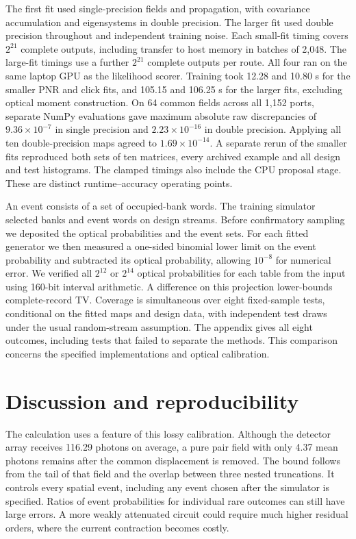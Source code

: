 \documentclass[11pt]{article}
\begin{document}
The first fit used single-precision fields and propagation, with covariance accumulation and eigensystems in double precision. The larger fit used double precision throughout and independent training noise. Each small-fit timing covers $2^{21}$ complete outputs, including transfer to host memory in batches of 2,048. The large-fit timings use a further $2^{21}$ complete outputs per route. All four ran on the same laptop GPU as the likelihood scorer. Training took 12.28 and 10.80 s for the smaller PNR and click fits, and 105.15 and 106.25 s for the larger fits, excluding optical moment construction. On 64 common fields across all 1,152 ports, separate NumPy evaluations gave maximum absolute raw discrepancies of $9.36\times10^{-7}$ in single precision and $2.23\times10^{-16}$ in double precision. Applying all ten double-precision maps agreed to $1.69\times10^{-14}$. A separate rerun of the smaller fits reproduced both sets of ten matrices, every archived example and all design and test histograms. The clamped timings also include the CPU proposal stage. These are distinct runtime--accuracy operating points.

An event consists of a set of occupied-bank words. The training simulator selected banks and event words on design streams. Before confirmatory sampling we deposited the optical probabilities and the event sets. For each fitted generator we then measured a one-sided binomial lower limit on the event probability and subtracted its optical probability, allowing $10^{-8}$ for numerical error. We verified all $2^{12}$ or $2^{14}$ optical probabilities for each table from the input using 160-bit interval arithmetic. A difference on this projection lower-bounds complete-record TV. Coverage is simultaneous over eight fixed-sample tests, conditional on the fitted maps and design data, with independent test draws under the usual random-stream assumption. The appendix gives all eight outcomes, including tests that failed to separate the methods. This comparison concerns the specified implementations and optical calibration.

\section{Discussion and reproducibility}
The calculation uses a feature of this lossy calibration. Although the detector array receives 116.29 photons on average, a pure pair field with only 4.37 mean photons remains after the common displacement is removed. The bound follows from the tail of that field and the overlap between three nested truncations. It controls every spatial event, including any event chosen after the simulator is specified. Ratios of event probabilities for individual rare outcomes can still have large errors. A more weakly attenuated circuit could require much higher residual orders, where the current contraction becomes costly.
\end{document}
